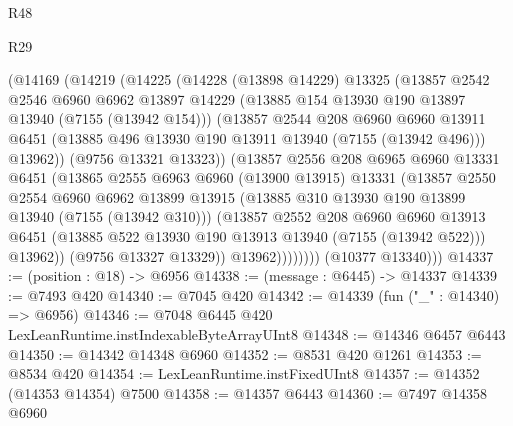 \begin{lexlean}{R48}
\begin{lexlean}{R29}
\begin{coremodule}
{{{{{{{{{{{{{{{{{{{{{{{{{{{{{{{{{{{{{{{{{{{{{{{{{{{{{{{{{{{{{{{{{{{{{{{{{{{{{{{{{{{{{{{{{{{{{{{{{{{{{{{{{{{{{{{{{{{{{{{{{{{{{{{{{{{{{{{{{{{{{{{{{{{{{{{{{{{{{{{{{{{{{{{{{{{{{{{{{{{{{{{{{{{{{{{{{{{{{{{{{{{{{{{{{{{{{{{{{{                (@14169
                  (@14219
                    (@14225
                      (@14228
                        (@13898 @14229)
                        @13325
                        (@13857
                          @2542
                          @2546
                          @6960
                          @6962
                          @13897
                          @14229
                          (@13885 @154 @13930 @190 @13897 @13940 (@7155 (@13942 @154)))
                          (@13857
                            @2544
                            @208
                            @6960
                            @6960
                            @13911
                            @6451
                            (@13885 @496 @13930 @190 @13911 @13940 (@7155 (@13942 @496)))
                            @13962))
                        (@9756 @13321 @13323))
                      (@13857
                        @2556
                        @208
                        @6965
                        @6960
                        @13331
                        @6451
                        (@13865
                          @2555
                          @6963
                          @6960
                          (@13900 @13915)
                          @13331
                          (@13857
                            @2550
                            @2554
                            @6960
                            @6962
                            @13899
                            @13915
                            (@13885 @310 @13930 @190 @13899 @13940 (@7155 (@13942 @310)))
                            (@13857
                              @2552
                              @208
                              @6960
                              @6960
                              @13913
                              @6451
                              (@13885 @522 @13930 @190 @13913 @13940 (@7155 (@13942 @522)))
                              @13962))
                          (@9756 @13327 @13329))
                        @13962))))))))
        (@10377 @13340)))
@14337 := (position : @18) -> @6956
@14338 := (message : @6445) -> @14337
@14339 := @7493 @420
@14340 := @7045 @420
@14342 := @14339 (fun ("_" : @14340) => @6956)
@14346 := @7048 @6445 @420 LexLeanRuntime.instIndexableByteArrayUInt8
@14348 := @14346 @6457 @6443
@14350 := @14342 @14348 @6960
@14352 := @8531 @420 @1261
@14353 := @8534 @420
@14354 := LexLeanRuntime.instFixedUInt8
@14357 := @14352 (@14353 @14354) @7500
@14358 := @14357 @6443
@14360 := @7497 @14358 @6960
}}}}}}}}}}}}}}}}}}}}}}}}}}}}}}}}}}}}}}}}}}}}}}}}}}}}}}}}}}}}}}}}}}}}}}}}}}}}}}}}}}}}}}}}}}}}}}}}}}}}}}}}}}}}}}}}}}}}}}}}}}}}}}}}}}}}}}}}}}}}}}}}}}}}}}}}}}}}}}}}}}}}}}}}}}}}}}}}}}}}}}}}}}}}}}}}}}}}}}}}}}}}}}}}}}}}}}}}}}
\end{coremodule}
\end{lexlean}
\end{lexlean}
